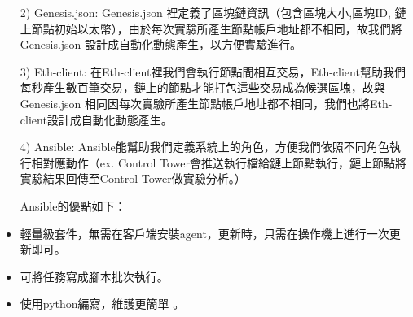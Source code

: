 \begin{itemize}
\item [2)] Genesis.json: Genesis.json 裡定義了區塊鏈資訊（包含區塊大小,區塊ID, 鏈上節點初始以太幣），由於每次實驗所產生節點帳戶地址都不相同，故我們將Genesis.json 設計成自動化動態產生，以方便實驗進行。 

\item [3)]Eth-client: 在Eth-client裡我們會執行節點間相互交易，Eth-client幫助我們每秒產生數百筆交易，鏈上的節點才能打包這些交易成為候選區塊，故與Genesis.json 相同因每次實驗所產生節點帳戶地址都不相同，我們也將Eth-client設計成自動化動態產生。 

\item [4)] Ansible: Ansible能幫助我們定義系統上的角色，方便我們依照不同角色執行相對應動作（ex. Control Tower會推送執行檔給鏈上節點執行，鏈上節點將實驗結果回傳至Control Tower做實驗分析。）

Ansible的優點如下：

\item 輕量級套件，無需在客戶端安裝agent，更新時，只需在操作機上進行一次更新即可。

\item 可將任務寫成腳本批次執行。

\item 使用python編寫，維護更簡單 。
\end{itemize}